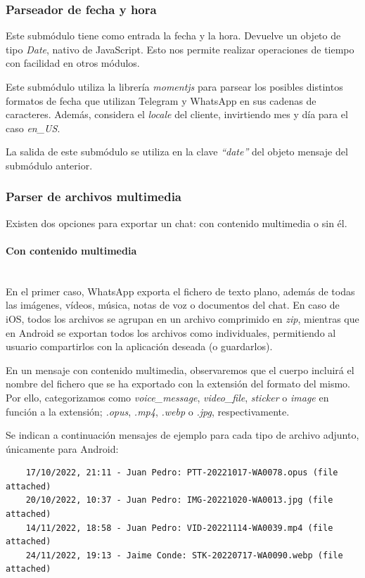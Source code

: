 \subsubsection{Parseador de fecha y hora}

Este submódulo tiene como entrada la fecha y la hora. Devuelve un objeto de tipo \textit{Date}, nativo de JavaScript. Esto nos permite realizar operaciones de tiempo con facilidad en otros módulos.

Este submódulo utiliza la librería \textit{momentjs} para parsear los posibles distintos formatos de fecha que utilizan Telegram y WhatsApp en sus cadenas de caracteres. Además, considera el \textit{locale} del cliente, invirtiendo mes y día para el caso \textit{en\_US}.

La salida de este submódulo se utiliza en la clave \textit{``date''} del objeto mensaje del submódulo anterior.

\subsubsection{Parser de archivos multimedia}

Existen dos opciones para exportar un chat: con contenido multimedia o sin él.

\paragraph{Con contenido multimedia}\mbox{}\\

En el primer caso, WhatsApp exporta el fichero de texto plano, además de todas las imágenes, vídeos, música, notas de voz o documentos del chat. En caso de iOS, todos los archivos se agrupan en un archivo comprimido en \textit{zip}, mientras que en Android se exportan todos los archivos como individuales, permitiendo al usuario compartirlos con la aplicación deseada (o guardarlos).

En un mensaje con contenido multimedia, observaremos que el cuerpo incluirá el nombre del fichero que se ha exportado con la extensión del formato del mismo. Por ello, categorizamos como \textit{voice\_message}, \textit{video\_file}, \textit{sticker} o \textit{image} en función a la extensión; \textit{.opus}, \textit{.mp4}, \textit{.webp} o \textit{.jpg}, respectivamente.

Se indican a continuación mensajes de ejemplo para cada tipo de archivo adjunto, únicamente para Android:

\begin{lstlisting}
	17/10/2022, 21:11 - Juan Pedro: PTT-20221017-WA0078.opus (file attached)
	20/10/2022, 10:37 - Juan Pedro: IMG-20221020-WA0013.jpg (file attached)
	14/11/2022, 18:58 - Juan Pedro: VID-20221114-WA0039.mp4 (file attached)
	24/11/2022, 19:13 - Jaime Conde: STK-20220717-WA0090.webp (file attached)
\end{lstlisting}

